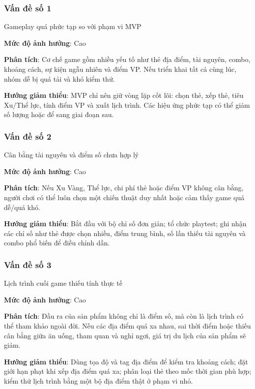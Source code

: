 \subsubsection{Vấn đề số 1}

\noindent Gameplay quá phức tạp so với phạm vi MVP

\textbf{Mức độ ảnh hưởng}: Cao

\textbf{Phân tích}: Cơ chế game gồm nhiều yếu tố như thẻ địa điểm, tài nguyên, combo, khoảng cách, sự kiện ngẫu nhiên và điểm VP. Nếu triển khai tất cả cùng lúc, nhóm dễ bị quá tải và khó kiểm thử.

\textbf{Hướng giảm thiểu}: MVP chỉ nên giữ vòng lặp cốt lõi: chọn thẻ, xếp thẻ, tiêu Xu/Thể lực, tính điểm VP và xuất lịch trình. Các hiệu ứng phức tạp có thể giảm số lượng hoặc để sang giai đoạn sau.

\subsubsection{Vấn đề số 2}

\noindent Cân bằng tài nguyên và điểm số chưa hợp lý

\textbf{Mức độ ảnh hưởng}: Cao

\textbf{Phân tích}: Nếu Xu Vàng, Thể lực, chi phí thẻ hoặc điểm VP không cân bằng, người chơi có thể luôn chọn một chiến thuật duy nhất hoặc cảm thấy game quá dễ/quá khó.

\textbf{Hướng giảm thiểu}: Bắt đầu với bộ chỉ số đơn giản; tổ chức playtest; ghi nhận các chỉ số như thẻ được chọn nhiều, điểm trung bình, số lần thiếu tài nguyên và combo phổ biến để điều chỉnh dần.

\subsubsection{Vấn đề số 3}

\noindent Lịch trình cuối game thiếu tính thực tế

\textbf{Mức độ ảnh hưởng}: Cao

\textbf{Phân tích}: Đầu ra của sản phẩm không chỉ là điểm số, mà còn là lịch trình có thể tham khảo ngoài đời. Nếu các địa điểm quá xa nhau, sai thời điểm hoặc thiếu cân bằng giữa ăn uống, tham quan và nghỉ ngơi, giá trị du lịch của sản phẩm sẽ giảm.

\textbf{Hướng giảm thiểu}: Dùng tọa độ và tag địa điểm để kiểm tra khoảng cách; đặt giới hạn phạt khi xếp địa điểm quá xa; phân loại thẻ theo mốc thời gian phù hợp; kiểm thử lịch trình bằng một bộ địa điểm thật ở phạm vi nhỏ.

